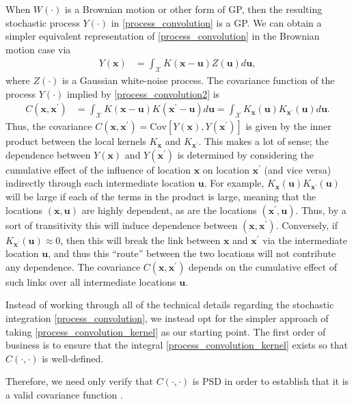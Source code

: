 \documentclass[12pt]{article}
\newcommand{\Cov}{\mathrm{Cov}}
\newcommand{\Ker}{K}
\newcommand{\covFun}{C}
\newcommand{\locSpace}{\mathcal{X}}
\newcommand{\loc}{\mathbf{x}}
\newcommand{\locTwo}{\loc^\prime}
\newcommand{\locDum}{\mathbf{u}}
\newcommand{\rf}{Y}
\begin{document}
When $W(\cdot)$ is a Brownian motion or other form of GP, then the resulting stochastic process $\rf(\cdot)$ in \ref{process_convolution} is a 
GP. We can obtain a simpler equivalent representation of \ref{process_convolution} in the Brownian motion case via
\begin{align}
\rf(\loc) &= \int_{\locSpace} \Ker(\loc - \locDum) Z(\locDum) d\locDum, \label{process_convolution2}
\end{align}
where $Z(\cdot)$ is a Gaussian white-noise process. The covariance function of the process $\rf(\cdot)$ implied by \ref{process_convolution2} is 
\begin{align}
\covFun(\loc, \locTwo) &= \int_{\locSpace} \Ker(\loc - \locDum)\Ker(\locTwo - \locDum) d\locDum =  \int_{\locSpace} \Ker_{\loc}(\locDum)\Ker_{\locTwo}(\locDum) d\locDum. \label{process_convolution_kernel}
\end{align}
Thus, the covariance $\covFun(\loc, \locTwo) = \Cov[\rf(\loc), \rf(\locTwo)]$ is given by the inner product between the local kernels $\Ker_{\loc}$ and $\Ker_{\locTwo}$. 
This makes a lot of sense; the dependence between $\rf(\loc)$ and $\rf(\locTwo)$ is determined by considering the cumulative effect of the influence of location $\loc$ on location $\locTwo$ (and vice versa) 
indirectly through each intermediate location $\locDum$. For example, $\Ker_{\loc}(\locDum)\Ker_{\locTwo}(\locDum)$ will be large if each of the terms in the product is large, meaning that the locations 
$(\loc, \locDum)$ are highly dependent, as are the locations $(\locTwo, \locDum)$. Thus, by a sort of transitivity this will induce dependence between $(\loc, \locTwo)$. Conversely, if 
$\Ker_{\locTwo}(\locDum) \approx 0$, then this will break the link between $\loc$ and $\locTwo$ via the intermediate location $\locDum$, and thus this ``route'' between the two locations will not contribute 
any dependence. The covariance $\covFun(\loc, \locTwo)$ depends on the cumulative effect of such links over all intermediate locations $\locDum$. 

Instead of working through all of the technical details regarding the stochastic integration \ref{process_convolution}, we instead opt for the simpler approach of taking \ref{process_convolution_kernel}
as our starting point. The first order of business is to ensure that the integral \ref{process_convolution_kernel} exists so that $\covFun(\cdot, \cdot)$ is well-defined. 


Therefore, we need only verify that $\covFun(\cdot, \cdot)$ is PSD in order to establish that it is a valid covariance function \cite{Paciorek}. 
\end{document}
